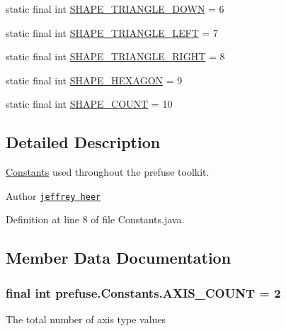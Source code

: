 \begin{DoxyCompactItemize}
static final int \hyperlink{interfaceprefuse_1_1_constants_a26e1be3622f398da5f9f7edfa845d527}{\-S\-H\-A\-P\-E\-\_\-\-T\-R\-I\-A\-N\-G\-L\-E\-\_\-\-D\-O\-W\-N} = 6
\item 
static final int \hyperlink{interfaceprefuse_1_1_constants_a9de8d68fa62d8fa46a0892436fc75d21}{\-S\-H\-A\-P\-E\-\_\-\-T\-R\-I\-A\-N\-G\-L\-E\-\_\-\-L\-E\-F\-T} = 7
\item 
static final int \hyperlink{interfaceprefuse_1_1_constants_aac60a6d86dc1127d8e4a0a37ef9c8d5e}{\-S\-H\-A\-P\-E\-\_\-\-T\-R\-I\-A\-N\-G\-L\-E\-\_\-\-R\-I\-G\-H\-T} = 8
\item 
static final int \hyperlink{interfaceprefuse_1_1_constants_a7ebd12625cb87984d166dba525c363bd}{\-S\-H\-A\-P\-E\-\_\-\-H\-E\-X\-A\-G\-O\-N} = 9
\item 
static final int \hyperlink{interfaceprefuse_1_1_constants_ae9a4848aafeb6df96b539414c2a3944b}{\-S\-H\-A\-P\-E\-\_\-\-C\-O\-U\-N\-T} = 10
\end{DoxyCompactItemize}


\subsection{\-Detailed \-Description}
\hyperlink{interfaceprefuse_1_1_constants}{\-Constants} used throughout the prefuse toolkit.

\begin{DoxyAuthor}{\-Author}
\href{http://jheer.org}{\tt jeffrey heer} 
\end{DoxyAuthor}


\-Definition at line 8 of file \-Constants.\-java.



\subsection{\-Member \-Data \-Documentation}
\hypertarget{interfaceprefuse_1_1_constants_a09cf6059e502acd9216360f040e345bb}{
\subsubsection[{\-A\-X\-I\-S\-\_\-\-C\-O\-U\-N\-T}]{\setlength{\rightskip}{0pt plus 5cm}final int {\bf prefuse.\-Constants.\-A\-X\-I\-S\-\_\-\-C\-O\-U\-N\-T} = 2}}\label{interfaceprefuse_1_1_constants_a09cf6059e502acd9216360f040e345bb}
\-The total number of axis type values 

